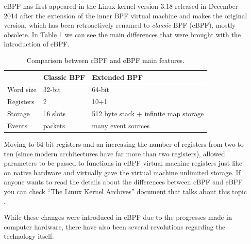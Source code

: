 eBPF has first appeared in the Linux kernel version 3.18 released in December 2014 after the extension of the inner BPF virtual machine and makes the original version, which has been retroactively renamed to \textit{classic} BPF (cBPF), mostly obsolete.
In Table \ref{table:cBPF_vs_eBPF} we can see the main differences that were brought with the introduction of eBPF.

\begin{table}[h]
	\centering
	\begin{tabular}{|| l | l | l ||} 
		\hline
		& Classic BPF & Extended BPF \\
		\hline
		\hline
		Word size & 32-bit & 64-bit \\
		\hline
		Registers & 2 & 10+1 \\
		\hline
		Storage & 16 slots & 512 byte stack + infinite map storage \\	
		\hline
		Events & packets & many event sources \\
		\hline
	\end{tabular}
	\caption{Comparison between cBPF and eBPF main features.}
	\label{table:cBPF_vs_eBPF}
\end{table}

Moving to 64-bit registers and an increasing the number of registers from two to ten (since modern architectures have far more than two registers), allowed parameters to be passed to functions in eBPF virtual machine registers just like on native hardware and virtually gave the virtual machine unlimited storage.
If anyone wants to read the details about the differences between cBPF and eBPF you can check ``The Linux Kernel Archives'' document that talks about this topic \cite{cBPFvseBPF}.

While these changes were introduced in eBPF due to the progresses made in computer hardware, there have also been several revolutions regarding the technology itself:

